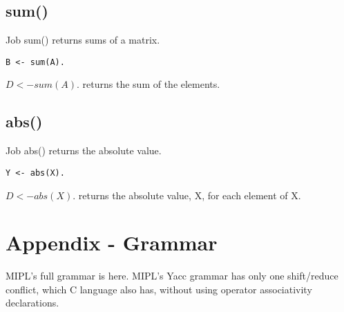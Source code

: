 \documentclass[prodmode,acmtecs]{acmsmall}
\begin{document}
\subsection{sum()}
Job sum() returns sums of a matrix.
\begin{lstlisting}
B <- sum(A).
\end{lstlisting}

$D <- sum(A).$ returns the sum of the elements.
\medskip

\subsection{abs()}
Job abs() returns the absolute value.
\begin{lstlisting}
Y <- abs(X).
\end{lstlisting}

$D <- abs(X).$ returns the absolute value, X, for each element of X.
\medskip

\bigskip
\bigskip
\bigskip
\bigskip

\section*{Appendix - Grammar}

MIPL's full grammar is here. MIPL's Yacc grammar has only one
shift/reduce conflict, which C language also has, without using
operator associativity declarations.


%
%




%
%



\medskip

\end{document}
